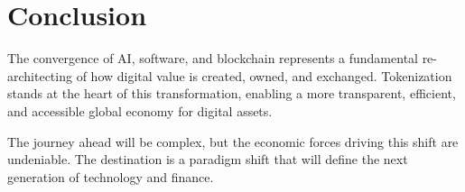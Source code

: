 \documentclass[11pt,a4paper]{report}
\begin{document}
\chapter*{Conclusion}

The convergence of AI, software, and blockchain represents a fundamental re-architecting of how digital value is created, owned, and exchanged. Tokenization stands at the heart of this transformation, enabling a more transparent, efficient, and accessible global economy for digital assets.

The journey ahead will be complex, but the economic forces driving this shift are undeniable. The destination is a paradigm shift that will define the next generation of technology and finance.
\end{document}
